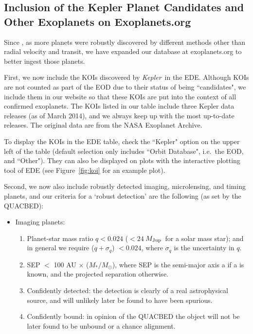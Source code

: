 \documentclass[11pt,preprint]{aastex}
\def\kepler{\textit{Kepler}}
\def\mjup{$M_{\rm Jup}$}
\begin{document}
\begin{CJK*}{UTF8}{gbsn}
\section{Inclusion of the Kepler Planet Candidates and Other Exoplanets on Exoplanets.org}\label{sec:kepler}

Since \cite{Wright2011}, as more planets were robustly discovered by
different methods other than radial velocity and transit, we have
expanded our database at exoplanets.org to better ingest those
planets.

First, we now include the KOIs discovered by \kepler\ in the
EDE. Although KOIs are not counted as part of the EOD due to their
status of being ``candidates", we include them in our website so that
these KOIs are put into the context of all confirmed exoplanets. The
KOIs listed in our table include three Kepler data releases (as of
March 2014), and we always keep up with the most up-to-date
releases. The original data are from the NASA Exoplanet Archive.

To display the KOIs in the EDE table, check the ``Kepler" option on
the upper left of the table (default selection only includes ``Orbit
Database", i.e.~the EOD, and ``Other"). They can also be displayed on
plots with the interactive plotting tool of EDE (see
Figure~\ref{fig:koi} for an example plot).

Second, we now also include
robustly detected imaging, microlensing, and timing planets, and our
criteria for a `robust detection' are the following (as set by the
QUACBED):

\begin{itemize}
\item Imaging planets:
\begin{enumerate}
\item Planet-star mass ratio $q < 0.024$ ($< 24\ $\mjup\ for a solar
  mass star); and in general we require ($q+\sigma_q$) $< 0.024$,
  where $\sigma_q$ is the uncertainty in $q$.
\item SEP $<$ 100 AU $\times$ ($M_*/M_\odot$), where SEP is the
  semi-major axis a if a is known, and the projected separation
  otherwise.
\item Confidently detected: the detection is clearly of a real
  astrophysical source, and will unlikely later be found to have been
  spurious.
\item Confidently bound: in opinion of the QUACBED the object will not
  be later found to be unbound or a chance alignment.


\end{enumerate}
\end{itemize}
\end{CJK*}
\end{document}
